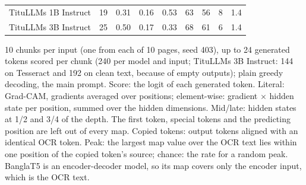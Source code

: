\begin{table}[t]
\begin{tabular}{lcccccccc}
TituLLMs 1B Instruct & 19 & 0.31 & 0.16 & 0.53 & 63 & 56 & 8 & 1.4 \\
TituLLMs 3B Instruct & 25 & 0.50 & 0.17 & 0.33 & 68 & 61 & 6 & 1.4 \\
\bottomrule
\end{tabular}
\par\smallskip
\begin{minipage}{\linewidth}\footnotesize 10 chunks per input (one from each of 10 pages, seed 403), up to 24 generated tokens scored per chunk (240 per model and input; TituLLMs 3B Instruct: 144 on Tesseract and 192 on clean text, because of empty outputs); plain greedy decoding, the main prompt. Score: the logit of each generated token. Literal: Grad-CAM, gradients averaged over positions; element-wise: gradient $\times$ hidden state per position, summed over the hidden dimensions. Mid/late: hidden states at 1/2 and 3/4 of the depth. The first token, special tokens and the predicting position are left out of every map. Copied tokens: output tokens aligned with an identical OCR token. Peak: the largest map value over the OCR text lies within one position of the copied token's source; chance: the rate for a random peak. BanglaT5 is an encoder-decoder model, so its map covers only the encoder input, which is the OCR text.\end{minipage}
\end{table}
